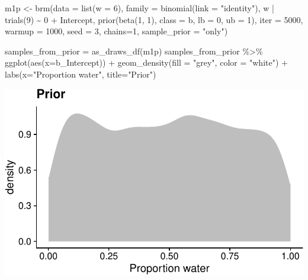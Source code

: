 \documentclass[
  letterpaper,
  DIV=11,
  numbers=noendperiod]{scrartcl}
\newenvironment{Shaded}{\begin{snugshade}}{\end{snugshade}}
\newcommand{\AttributeTok}[1]{\textcolor[rgb]{0.40,0.45,0.13}{#1}}
\newcommand{\DecValTok}[1]{\textcolor[rgb]{0.68,0.00,0.00}{#1}}
\newcommand{\FunctionTok}[1]{\textcolor[rgb]{0.28,0.35,0.67}{#1}}
\newcommand{\NormalTok}[1]{\textcolor[rgb]{0.00,0.23,0.31}{#1}}
\newcommand{\OtherTok}[1]{\textcolor[rgb]{0.00,0.23,0.31}{#1}}
\newcommand{\SpecialCharTok}[1]{\textcolor[rgb]{0.37,0.37,0.37}{#1}}
\newcommand{\StringTok}[1]{\textcolor[rgb]{0.13,0.47,0.30}{#1}}
\begin{document}
\begin{Shaded}
\begin{Highlighting}[numbers=left,,]
\NormalTok{m1p }\OtherTok{\textless{}{-}}
  \FunctionTok{brm}\NormalTok{(}\AttributeTok{data =} \FunctionTok{list}\NormalTok{(}\AttributeTok{w =} \DecValTok{6}\NormalTok{),                            }
      \AttributeTok{family =} \FunctionTok{binomial}\NormalTok{(}\AttributeTok{link =} \StringTok{"identity"}\NormalTok{),          }
\NormalTok{      w }\SpecialCharTok{|} \FunctionTok{trials}\NormalTok{(}\DecValTok{9}\NormalTok{) }\SpecialCharTok{\textasciitilde{}} \DecValTok{0} \SpecialCharTok{+}\NormalTok{ Intercept,                 }
      \FunctionTok{prior}\NormalTok{(}\FunctionTok{beta}\NormalTok{(}\DecValTok{1}\NormalTok{, }\DecValTok{1}\NormalTok{), }\AttributeTok{class =}\NormalTok{ b, }\AttributeTok{lb =} \DecValTok{0}\NormalTok{, }\AttributeTok{ub =} \DecValTok{1}\NormalTok{),  }
      \AttributeTok{iter =} \DecValTok{5000}\NormalTok{, }\AttributeTok{warmup =} \DecValTok{1000}\NormalTok{, }\AttributeTok{seed =} \DecValTok{3}\NormalTok{, }\AttributeTok{chains=}\DecValTok{1}\NormalTok{,          }
      \AttributeTok{sample\_prior =} \StringTok{"only"}\NormalTok{)}
\end{Highlighting}
\end{Shaded}

\begin{Shaded}
\begin{Highlighting}[]
\NormalTok{samples\_from\_prior }\OtherTok{=} \FunctionTok{as\_draws\_df}\NormalTok{(m1p)}
\NormalTok{samples\_from\_prior }\SpecialCharTok{\%\textgreater{}\%} 
  \FunctionTok{ggplot}\NormalTok{(}\FunctionTok{aes}\NormalTok{(}\AttributeTok{x=}\NormalTok{b\_Intercept)) }\SpecialCharTok{+}
  \FunctionTok{geom\_density}\NormalTok{(}\AttributeTok{fill =} \StringTok{"grey"}\NormalTok{, }\AttributeTok{color =} \StringTok{"white"}\NormalTok{) }\SpecialCharTok{+}
  \FunctionTok{labs}\NormalTok{(}\AttributeTok{x=}\StringTok{"Proportion water"}\NormalTok{, }\AttributeTok{title=}\StringTok{"Prior"}\NormalTok{)}
\end{Highlighting}
\end{Shaded}

\includegraphics[width=17.1875in,height=\textheight]{lecture02-1_files/figure-pdf/unnamed-chunk-10-1.pdf}
\end{document}
